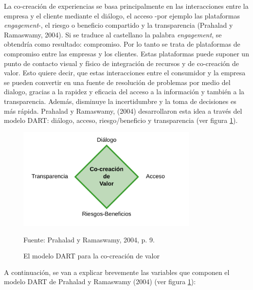 La co-creación de experiencias se basa principalmente en las interacciones entre la empresa y el cliente mediante el diálogo, el acceso -por ejemplo las plataformas \emph{engagement}-, el riesgo o beneficio compartido y la transparencia (Prahalad y Ramaswamy, 2004). Si se traduce al castellano la palabra \emph{engagement}, se obtendría como resultado: compromiso. Por lo tanto se trata de plataformas de compromiso entre las empresas y los clientes. Estas plataformas puede suponer un punto de contacto visual y físico de integración de recursos y de co-creación de valor. Esto quiere decir, que estas interacciones entre el consumidor y la empresa se pueden convertir en una fuente de resolución de problemas por medio del dialogo, gracias a la rapidez y eficacia del acceso a la información y también a la transparencia. Además, disminuye la incertidumbre y la toma de decisiones es más rápida. Prahalad y Ramaswamy, (2004) desarrollaron esta idea a través del modelo DART: diálogo, acceso, riesgo/beneficio y transparencia (ver figura \ref{fig:DartPrahalad}).

\begin{figure}[!h]
	\caption{El modelo DART para la co-creación de valor}
	\centering \includegraphics[width=90mm]{capitulos/graficos/DartPrahalad} 
	\label{fig:DartPrahalad} 

	\footnotesize
		Fuente: Prahalad y Ramaswamy, 2004, p. 9.
\end{figure}

A continuación, se van a explicar brevemente las variables que componen el modelo DART de Prahalad y Ramaswamy (2004) (ver figura \ref{fig:DartPrahalad}):

